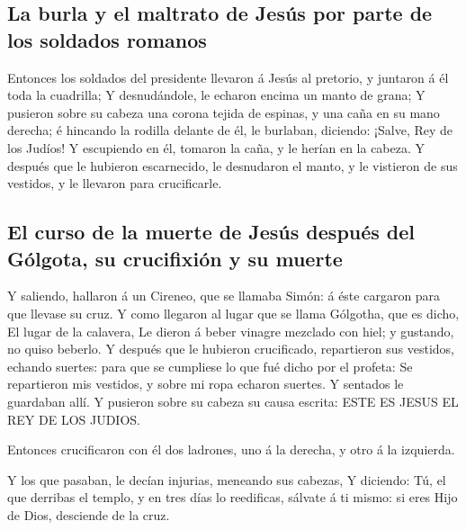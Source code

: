 \hypertarget{la-burla-y-el-maltrato-de-jesuxfas-por-parte-de-los-soldados-romanos}{%
\subsection{La burla y el maltrato de Jesús por parte de los soldados
romanos}\label{la-burla-y-el-maltrato-de-jesuxfas-por-parte-de-los-soldados-romanos}}

 Entonces los soldados del presidente llevaron á Jesús al
pretorio, y juntaron á él toda la cuadrilla;  Y
desnudándole, le echaron encima un manto de grana;  Y
pusieron sobre su cabeza una corona tejida de espinas, y una caña en su
mano derecha; é hincando la rodilla delante de él, le burlaban,
diciendo: ¡Salve, Rey de los Judíos!  Y escupiendo en él,
tomaron la caña, y le herían en la cabeza.  Y después que
le hubieron escarnecido, le desnudaron el manto, y le vistieron de sus
vestidos, y le llevaron para crucificarle.

\hypertarget{el-curso-de-la-muerte-de-jesuxfas-despuuxe9s-del-guxf3lgota-su-crucifixiuxf3n-y-su-muerte}{%
\subsection{El curso de la muerte de Jesús después del Gólgota, su
crucifixión y su
muerte}\label{el-curso-de-la-muerte-de-jesuxfas-despuuxe9s-del-guxf3lgota-su-crucifixiuxf3n-y-su-muerte}}

 Y saliendo, hallaron á un Cireneo, que se llamaba Simón: á
éste cargaron para que llevase su cruz.  Y como llegaron al
lugar que se llama Gólgotha, que es dicho, El lugar de la calavera,
 Le dieron á beber vinagre mezclado con hiel; y gustando,
no quiso beberlo.  Y después que le hubieron crucificado,
repartieron sus vestidos, echando suertes: para que se cumpliese lo que
fué dicho por el profeta: Se repartieron mis vestidos, y sobre mi ropa
echaron suertes.  Y sentados le guardaban allí.
 Y pusieron sobre su cabeza su causa escrita: ESTE ES JESUS
EL REY DE LOS JUDIOS.

 Entonces crucificaron con él dos ladrones, uno á la
derecha, y otro á la izquierda.

 Y los que pasaban, le decían injurias, meneando sus
cabezas,  Y diciendo: Tú, el que derribas el templo, y en
tres días lo reedificas, sálvate á ti mismo: si eres Hijo de Dios,
desciende de la cruz.

